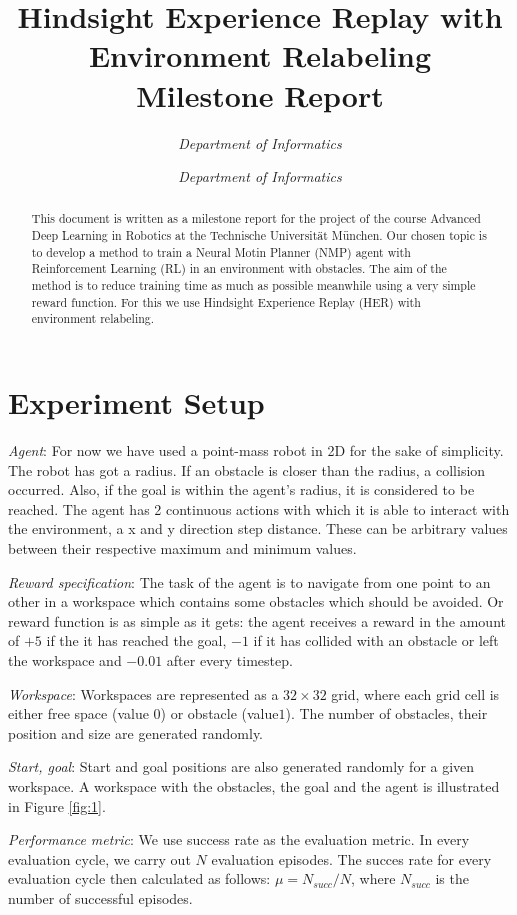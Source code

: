 \documentclass[conference]{IEEEtran}
\title{Hindsight Experience Replay with Environment Relabeling \\
	\bigskip
\Large{Milestone Report}}
\author{\IEEEauthorblockN{Katharina Hermann}
	\IEEEauthorblockA{\textit{Technische Universität München}}
	\textit{Department of Informatics}
	\and
	\IEEEauthorblockN{Ferenc Török}
	\IEEEauthorblockA{\textit{Technische Universität München}}
	\textit{Department of Informatics}
}
\begin{document}
\maketitle

\begin{abstract}
	This document is written as a milestone report for the project of the course Advanced Deep Learning in Robotics at the Technische Universität München. Our chosen topic is to develop a method to train a Neural Motin Planner (NMP) \cite{NMP} agent with Reinforcement Learning (RL) \cite{sutton_barto} in an environment with obstacles. The aim of the method is to reduce training time as much as possible meanwhile using a very simple reward function. For this we use Hindsight Experience Replay (HER) \cite{HER, GHER} with environment relabeling. 
\end{abstract}

\section{Experiment Setup}

\textit{Agent}: For now we have used a point-mass robot in 2D for the sake of simplicity. The robot has got a radius. If an obstacle is closer than the radius, a collision occurred. Also, if the goal is within the agent's radius, it is considered to be reached. The agent has 2 continuous actions with which it is able to interact with the environment, a x and y direction step distance. These can be arbitrary values between their respective maximum and minimum values.

\textit{Reward specification}: The task of the agent is to navigate from one point to an other in a workspace which contains some obstacles which should be avoided. Or reward function is as simple as it gets: the agent receives a reward in the amount of $+5$ if the it has reached the goal, $-1$ if it has collided with an obstacle or left the workspace and $-0.01$ after every timestep. 

\textit{Workspace}: Workspaces are represented as a $32 \times 32$ grid, where each grid cell is either free space (value $0$) or obstacle (value$1$). The number of obstacles, their position and size are generated randomly. 

\textit{Start, goal}: Start and goal positions are also generated randomly for a given workspace. A workspace with the obstacles, the goal and the agent is illustrated in Figure \ref{fig:1}.

\textit{Performance metric}: We use success rate as the evaluation metric. In every evaluation cycle, we carry out $N$ evaluation episodes. The succes rate for every evaluation cycle then calculated as follows: $\mu = N_{succ} / N$, where $N_{succ}$ is the number of successful episodes. 
\end{document}
